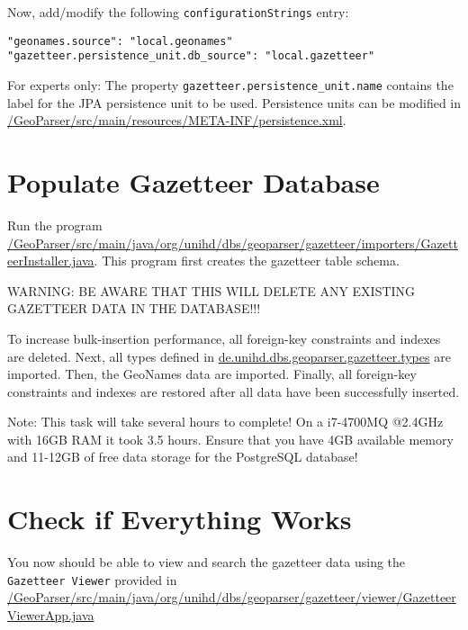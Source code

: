 \documentclass[fontsize=12pt, BCOR=10mm, DIV=14, parskip=true,headings=small]{scrartcl}
\begin{document}
Now, add/modify the following \texttt{configurationStrings} entry:

\begin{lstlisting}
"geonames.source": "local.geonames"
"gazetteer.persistence_unit.db_source": "local.gazetteer"
\end{lstlisting}

For experts only: The property \verb|gazetteer.persistence_unit.name| contains the label for the JPA persistence unit to be used. Persistence units can be modified in \url{/GeoParser/src/main/resources/META-INF/persistence.xml}.

\section{Populate Gazetteer Database}

Run the program \url{/GeoParser/src/main/java/org/unihd/dbs/geoparser/gazetteer/importers/GazetteerInstaller.java}. This program first creates the gazetteer table schema. 

WARNING: BE AWARE THAT THIS WILL DELETE ANY EXISTING GAZETTEER DATA IN THE DATABASE!!! 

To increase bulk-insertion performance, all foreign-key constraints and indexes are deleted. Next, all types defined in \url{de.unihd.dbs.geoparser.gazetteer.types} are imported. Then, the GeoNames data are imported. Finally, all foreign-key constraints and indexes are restored after all data have been successfully inserted.

Note: This task will take several hours to complete! On a i7-4700MQ @2.4GHz with 16GB RAM it took 3.5 hours. Ensure that you have 4GB available memory and 11-12GB of free data storage for the PostgreSQL database!

\section{Check if Everything Works}

You now should be able to view and search the gazetteer data using the \texttt{Gazetteer Viewer} provided in \url{/GeoParser/src/main/java/org/unihd/dbs/geoparser/gazetteer/viewer/GazetteerViewerApp.java}
\end{document}
